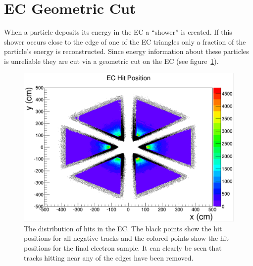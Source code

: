 \section{EC Geometric Cut}
\label{sec:ECgeometric}
%
When a particle deposits its energy in the EC a ``shower'' is created.
If this shower occurs close to the edge of one of the EC triangles only a fraction of the particle's energy is reconstructed.
Since energy information about these particles is unreliable they are cut via a geometric cut on the EC (see figure~\ref{fig:ECgeometricPlot}).
%
\begin{figure}[htp]
\centering
\includegraphics[width=5in]{figures/ECgeometricPlot.png}
\caption{The distribution of hits in the EC. The black points show the hit positions for all negative tracks and the colored points show the hit positions for the final electron sample. It can clearly be seen that tracks hitting near any of the edges have been removed.}
\label{fig:ECgeometricPlot}
\end{figure}
%
%

